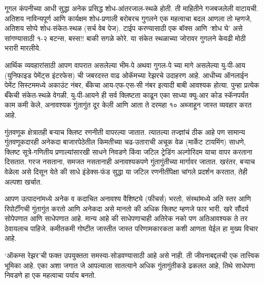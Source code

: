 गूगल कंपनीच्या आधी सुद्धा अनेक प्रसिद्ध शोध-आंतरजाल-स्थळे होती. ती माहितीने गजबजलेली वाटायची. अतिशय नाविन्यपूर्ण आणि कार्यक्षम शोध-प्रणाली बरोबरच गुगलने एक महत्वाचा बदल आणला तो म्हणजे, अतिशय सोप्पे शोध-संकेत-स्थळ (सर्च वेब पेज). टाईप करण्यासाठी एक बॉक्स आणि ‘शोध घे’ असे सांगण्यासाठी १-२ बटन्स, बस्स!! बाकी सगळे कोरे. या संकेत स्थळाच्या जोरावर गुगलने केवढी मोठी भरारी मारलीये. 

आर्थिक व्यवहारांसाठी आपण वापरात असलेल्या भीम-पे अथवा गुगल-पे च्या मागे असलेल्या यु-पी-आय (युनिफाइड पेमेंट्स इंटरफेस) ची जबरदस्त वाढ ओकॅमच्या रेझरचे उदाहरण आहे. आधीच्य ऑनलाईन पेमेंट सिस्टममध्ये अकाउंट नंबर, बँकेचा आय-एफ-एस-सी नंबर इत्यादी बाबी आवश्यक होत्या. पुन्हा प्रत्येक बँकेची संकेत-स्थळे वेगळी. यु-पी-आयने ही सर्व क्लिष्टता काढून एका साध्या क्यू-आर कोड स्कॅनपर्यंत काम कमी केले, अनावश्यक गुंतागुंत दूर केली आणि आता ते दरमहा १० अब्जाहून जास्त व्यवहार करत आहे.

गुंतवणूक क्षेत्रातही बऱ्याच क्लिष्ट रणनीती वापरल्या जातात. त्यातल्या तज्ज्ञांचं ठीक आहे पण सामान्य गुंतवणूकदारही अनेकदा बाजारपेठेतील किमतीच्या चढ-उताराची अचूक वेळ (मार्केट टायमिंग) साधणे, क्लिष्ट सूत्रे-गणितीय प्रणाल्यांसारखी साधने निवडणे किंवा जटिल ट्रेडिंग अल्गोरिदम याचा वापर करताना दिसतात. गरज नसताना, समजत नसतानाही अनावश्यकपणे गुंतागुंतीच्या मार्गावर जातात. खरंतर, बऱ्याच वेळेला असे दिसून येते की साधे इंडेक्स-फंड सुद्धा या जटिल रणनीतींपेक्षा चांगले प्रदर्शन करतात, तेही अल्पशा खर्चात.

आपण उत्पादनांमध्ये अनेक व कदाचित अनावश्य वैशिष्ट्ये (फीचर्स) भरतो, संस्थांमध्ये अति स्तर आणि रिपोर्टींगची गुंतागुंत करतो आणि अनेकदा असे मानतो की अधिक क्लिष्ट म्हणजे फार भारी. खरे सौंदर्य सोपेपणात आणि साधेपणात आहे. मान्य आहे की साधेपणाचाही अतिरेक नको पण अतिआवश्यक ते तर ठेवायलाच पाहिजे. कमीतकमी गोष्टीत जास्तीत जास्त परिणामकारकता कशी आणता येईल हा मुख्य विचार आहे. 

‘ऑकम्स रेझर’ची फक्त उपयुक्तता समस्या-सोडवण्यासाठी आहे असे नाही. ती जीवनाबद्दलची एक तात्त्विक भूमिका आहे. एका अशा जगात जे आपल्याला सातत्याने अधिक गुंतागुंतीकडे ढकलत आहे, तिथे साधेपणा निवडणे हा एक महत्वाचा पर्याय बनतो. 

